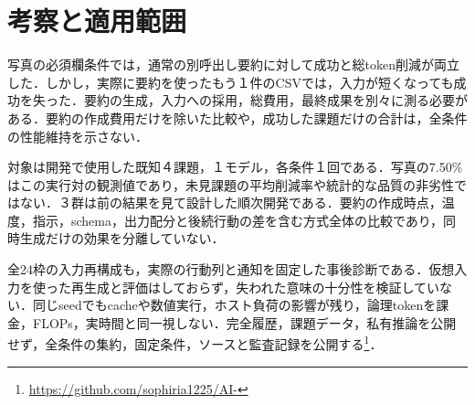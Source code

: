 \section{考察と適用範囲}
写真の必須欄条件では，通常の別呼出し要約に対して成功と総token削減が両立した．しかし，実際に要約を使ったもう１件のCSVでは，入力が短くなっても成功を失った．要約の生成，入力への採用，総費用，最終成果を別々に測る必要がある．要約の作成費用だけを除いた比較や，成功した課題だけの合計は，全条件の性能維持を示さない．

対象は開発で使用した既知４課題，１モデル，各条件１回である．写真の7.50\%はこの実行対の観測値であり，未見課題の平均削減率や統計的な品質の非劣性ではない．３群は前の結果を見て設計した順次開発である．要約の作成時点，温度，指示，schema，出力配分と後続行動の差を含む方式全体の比較であり，同時生成だけの効果を分離していない．

全24枠の入力再構成も，実際の行動列と通知を固定した事後診断である．仮想入力を使った再生成と評価はしておらず，失われた意味の十分性を検証していない．同じseedでもcacheや数値実行，ホスト負荷の影響が残り，論理tokenを課金，FLOPs，実時間と同一視しない．完全履歴，課題データ，私有推論を公開せず，全条件の集約，固定条件，ソースと監査記録を公開する\footnote{\url{https://github.com/sophiria1225/AI-}}．
